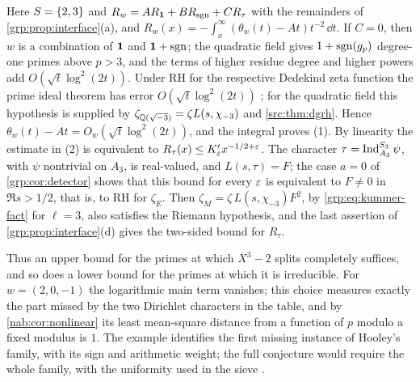 
Here $S=\{2,3\}$ and $R_w=AR_{\mathbf{1}}+BR_{\operatorname{sgn}}+CR_\tau$ with the remainders of
\cref{grp:prop:interface}(a), and $R_w(x)=-\int_x^\infty(\theta_w(t)-At)t^{-2}\,\dd t$.
If $C=0$, then $w$ is a combination of $\mathbf{1}$ and $\mathbf{1}+\operatorname{sgn}$; the quadratic field
gives $1+\operatorname{sgn}(g_p)$ degree-one primes above $p>3$, and the terms of higher residue
degree and higher powers add $O(\sqrt t\log^2(2t))$. Under RH for the respective Dedekind
zeta function the prime ideal theorem has error $O(\sqrt t\log^2(2t))$
\cite{GrenieMolteni2016Explicit}; for the quadratic field this hypothesis is supplied by
$\zeta_{\mathbb{Q}(\sqrt{-3})}=\zeta L(s,\chi_{-3})$ and \cref{src:thm:dgrh}. Hence
$\theta_w(t)-At=O_w(\sqrt t\log^2(2t))$, and the integral proves (1). By linearity the estimate in
(2) is equivalent to $R_\tau(x)\le K'_\varepsilon x^{-1/2+\varepsilon}$. The character
$\tau=\operatorname{Ind}_{A_3}^{S_3}\psi$, with $\psi$ nontrivial on $A_3$, is real-valued, and
$L(s,\tau)=F$; the case $a=0$ of \cref{grp:cor:detector} shows that this bound for every
$\varepsilon$ is equivalent to $F\ne0$ in $\Re s>1/2$, that is, to RH for $\zeta_E$. Then
$\zeta_M=\zeta\,L(s,\chi_{-3})F^2$, by \eqref{grp:eq:kummer-fact} for $\ell=3$, also
satisfies the Riemann hypothesis, and the last assertion of \cref{grp:prop:interface}(d)
gives the two-sided bound for $R_\tau$.

Thus an upper bound for the primes at which $X^3-2$ splits completely suffices, and so
does a lower bound for the primes at which it is irreducible. For $w=(2,0,-1)$ the
logarithmic main term vanishes; this choice measures exactly the part missed by the two
Dirichlet characters in the table, and by \cref{nab:cor:nonlinear} its least mean-square
distance from a function of $p$ modulo a fixed modulus is $1$. The example identifies the
first missing instance of Hooley's family, with its sign and arithmetic weight; the full
conjecture would require the whole family, with the uniformity used in the sieve
\cite{FanPollack2025Counting}.

